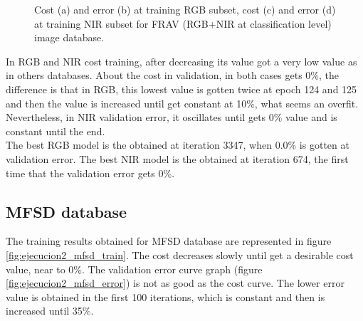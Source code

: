 \begin{figure}[htb]
\caption{Cost (a) and error (b) at training RGB subset, cost (c) and error (d) at training NIR subset for FRAV (RGB+NIR at classification level) image database.}
\label{fig:ejecucion2_frav_clas_train}
\end{figure}

In RGB and NIR cost training, after decreasing its value got a very low value as in others databases. About the cost in validation, in both cases gets 0\%, the difference is that in RGB, this lowest value is gotten twice at epoch 124 and 125 and then the value is increased until get constant at 10\%, what seems an overfit. Nevertheless, in NIR validation error, it oscillates until gets 0\% value and is constant until the end.\\

The best RGB model is the obtained at iteration 3347, when 0.0\% is gotten at validation error. The best NIR model is the obtained at iteration 674, the first time that the validation error gets 0\%.

\subsection{MFSD database}
The training results obtained for MFSD database are represented in figure \ref{fig:ejecucion2_mfsd_train}. The cost decreases slowly until get a desirable cost value, near to 0\%. The validation error curve graph (figure \ref{fig:ejecucion2_mfsd_error}) is not as good as the cost curve. The lower error value is obtained in the first 100 iterations, which is constant and then is increased until 35\%.\\

